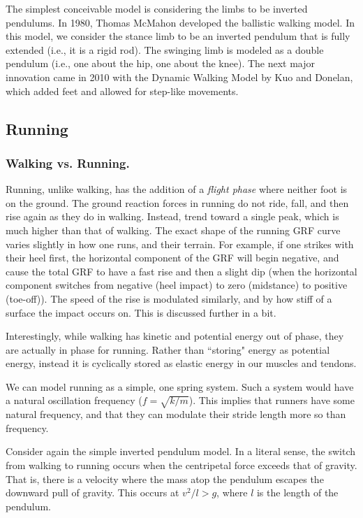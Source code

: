 The simplest conceivable model is considering the limbs to be inverted pendulums. In 1980, Thomas McMahon developed the ballistic walking model. In this model, we consider the stance limb to be an inverted pendulum that is fully extended (i.e., it is a rigid rod). The swinging limb is modeled as a double pendulum (i.e., one about the hip, one about the knee). The next major innovation came in 2010 with the Dynamic Walking Model by Kuo and Donelan, which added feet and allowed for step-like movements. 


\subsection{Running}

\subsubsection{Walking vs. Running.}

Running, unlike walking, has the addition of a \textit{flight phase} where neither foot is on the ground. The ground reaction forces in running do not ride, fall, and then rise again as they do in walking. Instead, trend toward a single peak, which is much higher than that of walking. The exact shape of the running GRF curve varies slightly in how one runs, and their terrain. For example, if one strikes with their heel first, the horizontal component of the GRF will begin negative, and cause the total GRF to have a fast rise and then a slight dip (when the horizontal component switches from negative (heel impact) to zero (midstance) to positive (toe-off)). The speed of the rise is modulated similarly, and by how stiff of a surface the impact occurs on. This is discussed further in a bit. \newline

Interestingly, while walking has kinetic and potential energy out of phase, they are actually in phase for running. Rather than ``storing" energy as potential energy, instead it is cyclically stored as elastic energy in our muscles and tendons.\newline

We can model running as a simple, one spring system. Such a system would have a natural oscillation frequency ($f = \sqrt{k / m}$). This implies that runners have some natural frequency, and that they can modulate their stride length more so than frequency.\newline

Consider again the simple inverted pendulum model. In a literal sense, the switch from walking to running occurs when the centripetal force exceeds that of gravity. That is, there is a velocity where the mass atop the pendulum escapes the downward pull of gravity. This occurs at $v^2 / l > g$, where $l$ is the length of the pendulum.\newline

